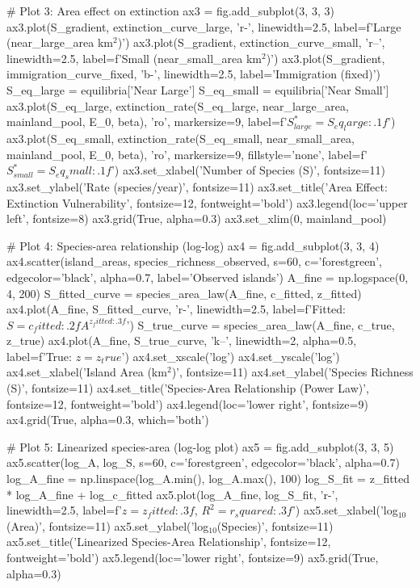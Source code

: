 \documentclass[a4paper, 11pt]{article}
\begin{document}
\begin{pycode}
# Plot 3: Area effect on extinction
ax3 = fig.add_subplot(3, 3, 3)
ax3.plot(S_gradient, extinction_curve_large, 'r-', linewidth=2.5, label=f'Large ({near_large_area} km$^2$)')
ax3.plot(S_gradient, extinction_curve_small, 'r--', linewidth=2.5, label=f'Small ({near_small_area} km$^2$)')
ax3.plot(S_gradient, immigration_curve_fixed, 'b-', linewidth=2.5, label='Immigration (fixed)')
S_eq_large = equilibria['Near Large']
S_eq_small = equilibria['Near Small']
ax3.plot(S_eq_large, extinction_rate(S_eq_large, near_large_area, mainland_pool, E_0, beta),
         'ro', markersize=9, label=f'$S^*_{{large}} = {S_eq_large:.1f}$')
ax3.plot(S_eq_small, extinction_rate(S_eq_small, near_small_area, mainland_pool, E_0, beta),
         'ro', markersize=9, fillstyle='none', label=f'$S^*_{{small}} = {S_eq_small:.1f}$')
ax3.set_xlabel('Number of Species (S)', fontsize=11)
ax3.set_ylabel('Rate (species/year)', fontsize=11)
ax3.set_title('Area Effect: Extinction Vulnerability', fontsize=12, fontweight='bold')
ax3.legend(loc='upper left', fontsize=8)
ax3.grid(True, alpha=0.3)
ax3.set_xlim(0, mainland_pool)

# Plot 4: Species-area relationship (log-log)
ax4 = fig.add_subplot(3, 3, 4)
ax4.scatter(island_areas, species_richness_observed, s=60, c='forestgreen',
            edgecolor='black', alpha=0.7, label='Observed islands')
A_fine = np.logspace(0, 4, 200)
S_fitted_curve = species_area_law(A_fine, c_fitted, z_fitted)
ax4.plot(A_fine, S_fitted_curve, 'r-', linewidth=2.5,
         label=f'Fitted: $S = {c_fitted:.2f}A^{{{z_fitted:.3f}}}$')
S_true_curve = species_area_law(A_fine, c_true, z_true)
ax4.plot(A_fine, S_true_curve, 'k--', linewidth=2, alpha=0.5, label=f'True: $z = {z_true}$')
ax4.set_xscale('log')
ax4.set_yscale('log')
ax4.set_xlabel('Island Area (km$^2$)', fontsize=11)
ax4.set_ylabel('Species Richness (S)', fontsize=11)
ax4.set_title('Species-Area Relationship (Power Law)', fontsize=12, fontweight='bold')
ax4.legend(loc='lower right', fontsize=9)
ax4.grid(True, alpha=0.3, which='both')

# Plot 5: Linearized species-area (log-log plot)
ax5 = fig.add_subplot(3, 3, 5)
ax5.scatter(log_A, log_S, s=60, c='forestgreen', edgecolor='black', alpha=0.7)
log_A_fine = np.linspace(log_A.min(), log_A.max(), 100)
log_S_fit = z_fitted * log_A_fine + log_c_fitted
ax5.plot(log_A_fine, log_S_fit, 'r-', linewidth=2.5,
         label=f'$z = {z_fitted:.3f}$, $R^2 = {r_squared:.3f}$')
ax5.set_xlabel('log$_{10}$(Area)', fontsize=11)
ax5.set_ylabel('log$_{10}$(Species)', fontsize=11)
ax5.set_title('Linearized Species-Area Relationship', fontsize=12, fontweight='bold')
ax5.legend(loc='lower right', fontsize=9)
ax5.grid(True, alpha=0.3)


\end{pycode}
\end{document}
